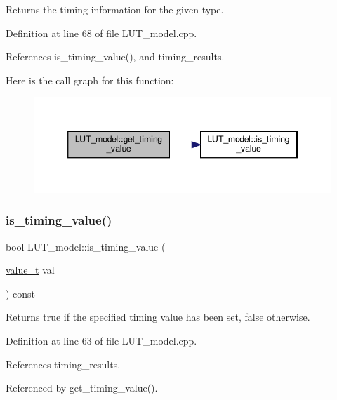 Returns the timing information for the given type. 



Definition at line 68 of file L\+U\+T\+\_\+model.\+cpp.



References is\+\_\+timing\+\_\+value(), and timing\+\_\+results.

Here is the call graph for this function\+:
\nopagebreak
\begin{figure}[H]
\begin{center}
\leavevmode
\includegraphics[width=346pt]{dd/da2/classLUT__model_a36109f570f043a338845fe6a4ab29e87_cgraph}
\end{center}
\end{figure}
\mbox{\label{classLUT__model_a9133ca4602d0a2470a5b47916e649d59}} 
\subsubsection{\texorpdfstring{is\+\_\+timing\+\_\+value()}{is\_timing\_value()}}
{\footnotesize\ttfamily bool L\+U\+T\+\_\+model\+::is\+\_\+timing\+\_\+value (\begin{DoxyParamCaption}\item[{\hyperlink{classLUT__model_a863cc03b53b14df7344ada5a1bed2b20}{value\+\_\+t}}]{val }\end{DoxyParamCaption}) const}



Returns true if the specified timing value has been set, false otherwise. 



Definition at line 63 of file L\+U\+T\+\_\+model.\+cpp.



References timing\+\_\+results.



Referenced by get\+\_\+timing\+\_\+value().

